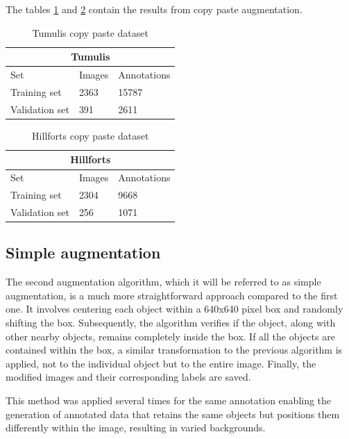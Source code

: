 The tables \ref{table:tumuliscopypastedataste} and \ref{table:hillfortscopypastedataste} contain the results from copy paste augmentation.

\begin{table}[H]
\centering
\begin{tabular}{|p{3cm}|p{2.5cm}|p{2cm}|} 
\hline
\multicolumn{3}{|c|}{Tumulis} \\
 \hline
  Set & Images & Annotations\\ [0.5ex] 
 \hline
 Training set & 2363 & 15787 \\ 
 Validation set & 391 & 2611  \\[1ex]
 \hline
\end{tabular}
\caption{Tumulis copy paste dataset}
\label{table:tumuliscopypastedataste}
\end{table} 

\begin{table}[H]
\centering
\begin{tabular}{|p{3cm}|p{2.5cm}|p{2cm}|} 
\hline
\multicolumn{3}{|c|}{Hillforts} \\
 \hline
  Set & Images & Annotations\\ [0.5ex] 
 \hline
 Training set & 2304 & 9668 \\ 
 Validation set & 256 & 1071  \\[1ex]
 \hline
\end{tabular}
\caption{Hillforts copy paste dataset}
\label{table:hillfortscopypastedataste}
\end{table} 


\subsection{Simple augmentation}
The second augmentation algorithm,  which it will be referred to as simple augmentation, is a much more straightforward approach compared to the first one. It involves centering each object within a 640x640 pixel box and randomly shifting the box. Subsequently, the algorithm verifies if the object, along with other nearby objects, remains completely inside the box. If all the objects are contained within the box, a similar transformation to the previous algorithm is applied, not to the individual object but to the entire image. Finally, the modified images and their corresponding labels are saved.

This method was applied several times for the same annotation enabling the generation of annotated data that retains the same objects but positions them differently within the image, resulting in varied backgrounds.

